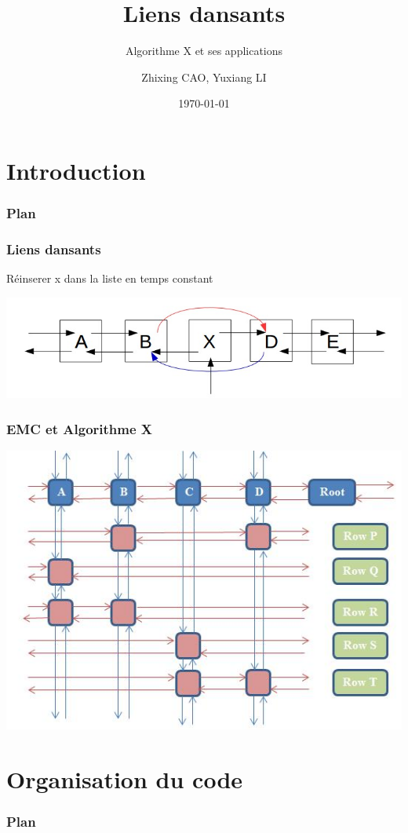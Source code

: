 \documentclass[12pt,t]{beamer}
\title{Liens dansants}
\subtitle{Algorithme X et ses applications}
\author{Zhixing CAO, Yuxiang LI}
\institute{INF\ 441}
\date[]{\today}
\begin{document}
\frame[plain]{\titlepage}

\section{Introduction}

\begin{frame}
\frametitle{Plan}
\tableofcontents[currentsection]
\end{frame}

\begin{frame}
\frametitle{Liens dansants} 
Réinserer x dans la liste en temps constant
\begin{center}
\includegraphics[width=.95\textwidth]{noeud.jpg}
\label{fig:node}
\end{center}
\end{frame}

\begin{frame}
\frametitle{EMC et Algorithme X}
\begin{center}
\includegraphics[width=.85\textwidth]{ImgDLinks.JPG}
\label{fig:dlx}
\end{center}
\end{frame}

\section{Organisation du code}

\begin{frame}
\frametitle{Plan}
\tableofcontents[currentsection]
\end{frame}
\end{document}
